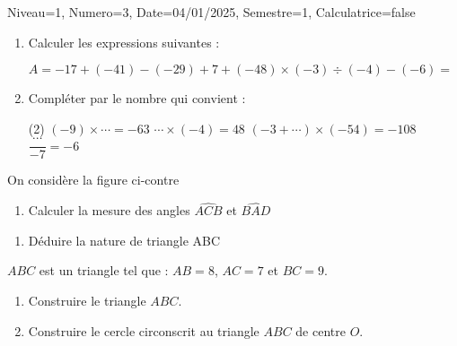 \documentclass[a4paper,12pt]{article}
\begin{document}
\begin{Maquette}[DS]{Niveau=1, Numero=3, Date=04/01/2025, Semestre=1, Calculatrice=false}

\begin{exercice}
\begin{enumerate}
\item{} Calculer les expressions suivantes :

$A=-17+(-41)-(-29)+7+(-48)\times (-3)\div (-4)-(-6)=$
\anserline[3]
\item{} Compléter par le nombre qui convient :
\begin{tasks}[style=itemize](2)
\task $(-9)\times \cdots = -63$
\task $ \cdots \times (-4) = 48$
\task $(-3+ \cdots )\times (-54)= -108$
\task $\dfrac{\cdots}{-7}=-6$
\end{tasks} 
\end{enumerate}
\end{exercice}

\begin{exercice}
\begin{minipage}{.65\linewidth}
On considère la figure ci-contre 
\begin{enumerate}
\item{} Calculer la mesure des angles $\widehat{ACB}$ et $\widehat{BAD}$ \newline\anserline[3]
\end{enumerate}
\end{minipage}
\begin{minipage}{.35\linewidth}
\end{minipage}
\begin{enumerate}[start=2]
\item{} Déduire la nature de triangle ABC\newline
\anserline[4] 
\end{enumerate}
\end{exercice}
\begin{exercice}
$ABC$ est un triangle tel que : $AB=8$, $AC=7$ et $BC=9$.
\begin{enumerate}
\item{} Construire le triangle $ABC$.
\item{} Construire le cercle circonscrit au triangle $ABC$ de centre $O$.
\end{enumerate}
\end{exercice}
\end{Maquette}
\end{document}
